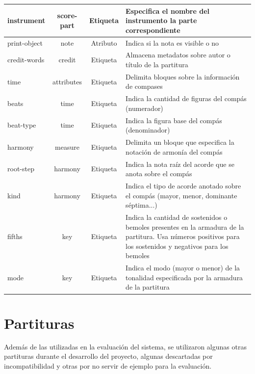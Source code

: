 \begin{center}
\begin{longtable}{ | l | c | c | l | }
 		instrument & score-part & Etiqueta & \parbox[l]{6.5cm}{\raggedright Especifica el nombre del instrumento la parte correspondiente} \\ \hline
 		print-object & note & Atributo & \parbox[l]{6.5cm}{\raggedright Indica si la nota es visible o no} \\ \hline
 		credit-words & credit & Etiqueta & \parbox[l]{6.5cm}{\raggedright Almacena metadatos sobre autor o título de la partitura} \\ \hline
 		time & attributes & Etiqueta & \parbox[l]{6.5cm}{\raggedright Delimita bloques sobre la información de compases} \\ \hline
 		beats & time & Etiqueta & \parbox[l]{6.5cm}{\raggedright Indica la cantidad de figuras del compás (numerador)} \\ \hline
 		beat-type & time & Etiqueta & \parbox[l]{6.5cm}{\raggedright Indica la figura base del compás (denominador)} \\ \hline
 		harmony & measure & Etiqueta & \parbox[l]{6.5cm}{\raggedright Delimita un bloque que especifica la notación de armonía del compás} \\ \hline
 		root-step & harmony & Etiqueta & \parbox[l]{6.5cm}{\raggedright Indica la nota raíz del acorde que se anota sobre el compás} \\ \hline
 		kind & harmony & Etiqueta & \parbox[l]{6.5cm}{\raggedright Indica el tipo de acorde anotado sobre el compás (mayor, menor, dominante séptima...)} \\ \hline
 		fifths & key & Etiqueta & \parbox[l]{6.5cm}{\raggedright Indica la cantidad de sostenidos o bemoles presentes en la armadura de la partitura. Usa números positivos para los sostenidos y negativos para los bemoles} \\ \hline
 		mode & key & Etiqueta & \parbox[l]{6.5cm}{\raggedright Indica el modo (mayor o menor) de la tonalidad especificada por la armadura de la partitura} \\ \hline
 	\end{longtable}
 \end{center} 
 
 \chapter{Partituras}
 \label{chap:scores}
 Además de las utilizadas en la evaluación del sistema, se utilizaron algunas otras partituras durante el desarrollo del proyecto, algunas descartadas por incompatibilidad y otras por no servir de ejemplo para la evaluación.
 
